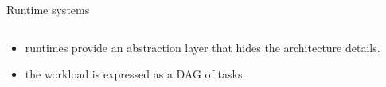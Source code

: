 \documentclass{beamer}
\begin{document}
\begin{frame}{Runtime systems}
\begin{columns}
\begin{column}{0.55\textwidth}
\begin{itemize}
      \item<2-> runtimes provide an abstraction layer that hides the
        architecture details.
      \item<3-> the workload is expressed as a DAG of tasks.
      \end{itemize}
    \end{column}
  \end{columns}
\end{frame}
\end{document}
